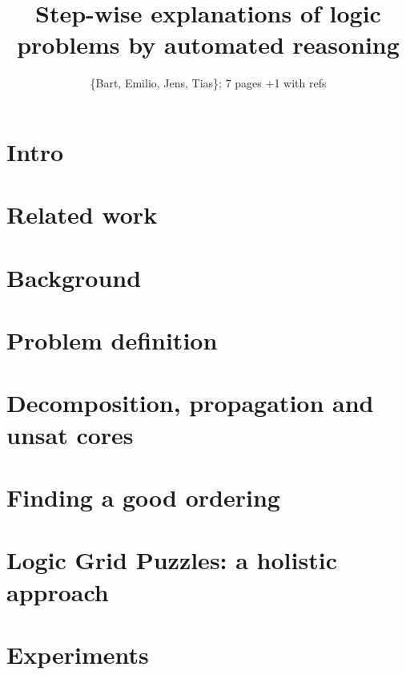 \documentclass{ecai}
\begin{document}
\title{Step-wise explanations of logic problems by automated reasoning}

\author{\{Bart, Emilio, Jens, Tias\}; 7 pages +1 with refs}

\maketitle


\begin{abstract}

\end{abstract}


\section{Intro}



\section{Related work}


\section{Background}


\section{Problem definition}



\section{Decomposition, propagation and unsat cores}



\section{Finding a good ordering}



\section{Logic Grid Puzzles: a holistic approach}\label{sec:holistic}



\section{Experiments}




\end{document}
